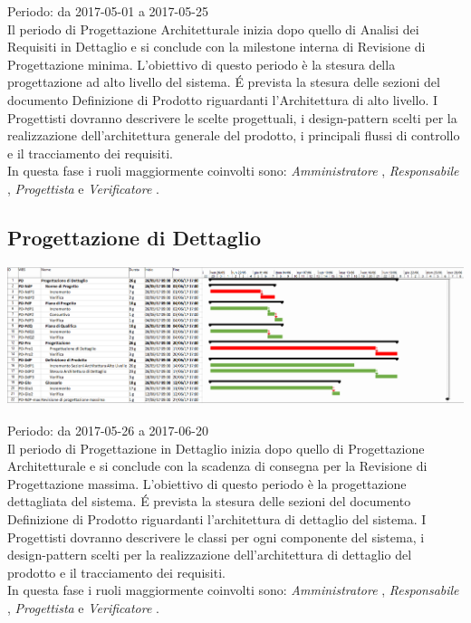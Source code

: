 Periodo: da 2017-05-01 a 2017-05-25 \\
Il periodo di Progettazione Architetturale inizia dopo quello di Analisi dei Requisiti
in Dettaglio e si conclude con la milestone interna di Revisione di Progettazione minima.
L’obiettivo di questo periodo è la stesura della progettazione ad alto livello del sistema.
\'E prevista la stesura delle sezioni del documento Definizione di Prodotto riguardanti l'Architettura di alto livello. 
I Progettisti dovranno descrivere le scelte progettuali, i design-pattern scelti per la realizzazione dell’architettura generale del prodotto, i principali flussi di controllo e il tracciamento dei requisiti. \\
In questa fase i ruoli maggiormente coinvolti sono:  \emph{Amministratore} ,  \emph{Responsabile} ,
 \emph{Progettista}  e  \emph{Verificatore} . \\

\subsection{Progettazione di Dettaglio}

\begin{center}
  \includegraphics[scale=0.2]{img/4-PD.png}
\end{center}

Periodo: da 2017-05-26 a 2017-06-20 \\
Il periodo di Progettazione in Dettaglio inizia dopo quello di Progettazione Architetturale
e si conclude con la scadenza di consegna per la Revisione di Progettazione massima.
L’obiettivo di questo periodo è la progettazione dettagliata del sistema.
\'E prevista la stesura delle sezioni del documento Definizione di Prodotto riguardanti l'architettura di dettaglio del sistema.
I Progettisti dovranno descrivere le classi per ogni componente del sistema, i design-pattern scelti per la realizzazione dell’architettura di dettaglio del prodotto e il tracciamento dei requisiti. \\
In questa fase i ruoli maggiormente coinvolti sono:  \emph{Amministratore} ,  \emph{Responsabile} ,
 \emph{Progettista}  e  \emph{Verificatore} .

